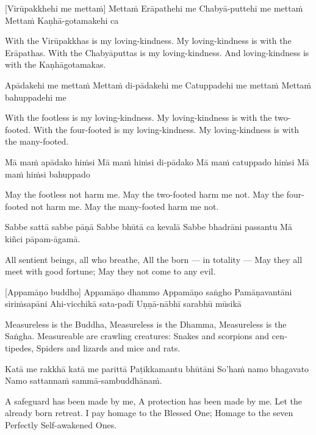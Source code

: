 \begin{english}
\begin{english}
\suttaRef{[Snp 1.8]}

[Virūpakkhehi me mettaṁ]
Mettaṁ Erāpathehi me
Chabyā-puttehi me mettaṁ
Mettaṁ Kaṇhā-gotamakehi ca

\begin{english}
With the Virūpakkhas is my loving-kindness.
My loving-kindness is with the Erāpathas.
With the Chabyāputtas is my loving-kindness.
And loving-kindness is with the Kaṇhāgotamakas.
\end{english}

Apādakehi me mettaṁ
Mettaṁ di-pādakehi me
Catuppadehi me mettaṁ
Mettaṁ bahuppadehi me

\begin{english}
With the footless is my loving-kindness.
My loving-kindness is with the two-footed.
With the four-footed is my loving-kindness.
My loving-kindness is with the many-footed.
\end{english}

Mā maṁ apādako hiṁsi
Mā maṁ hiṁsi di-pādako
Mā maṁ catuppado hiṁsi
Mā maṁ hiṁsi bahuppado

\begin{english}
May the footless not harm me.
May the two-footed harm me not.
May the four-footed not harm me.
May the many-footed harm me not.
\end{english}

Sabbe sattā sabbe pāṇā
Sabbe bhūtā ca kevalā
Sabbe bhadrāni passantu
Mā kiñci pāpam-āgamā.

\begin{english}
All sentient beings, all who breathe,
All the born — in totality —
May they all meet with good fortune;
May they not come to any evil.
\end{english}

[Appamāṇo buddho]
Appamāṇo dhammo
Appamāṇo saṅgho
Pamāṇavantāni siriṁsapāni
Ahi-vicchikā sata-padī
Uṇṇā-nābhī sarabhū mūsikā

\begin{english}
Measureless is the Buddha,
Measureless is the Dhamma,
Measureless is the Saṅgha.
Measureable are crawling creatures:
Snakes and scorpions and centipedes,
Spiders and lizards and mice and rats.
\end{english}

Katā me rakkhā katā me parittā
Paṭikkamantu bhūtāni
So’haṁ namo bhagavato
Namo sattannaṁ sammā-sambuddhānaṁ.

\begin{english}
A safeguard has been made by me,
A protection has been made by me.
Let the already born retreat.
I pay homage to the Blessed One;
Homage to the seven Perfectly Self-awakened Ones.
\end{english}


\end{english}
\end{english}

